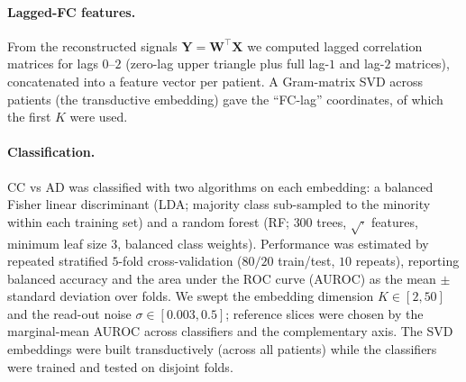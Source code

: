 \documentclass[11pt]{article}
\begin{document}
\paragraph{Lagged-FC features.}
From the reconstructed signals $\mathbf{Y}=\mathbf{W}^{\!\top}\mathbf{X}$ we
computed lagged correlation matrices for lags $0$--$2$ (zero-lag upper triangle
plus full lag-$1$ and lag-$2$ matrices), concatenated into a feature vector per
patient. A Gram-matrix SVD across patients (the transductive embedding) gave the
``FC-lag'' coordinates, of which the first $K$ were used.

\paragraph{Classification.}
CC vs AD was classified with two algorithms on each embedding: a balanced
Fisher linear discriminant (LDA; majority class sub-sampled to the minority
within each training set) and a random forest (RF; $300$ trees, $\sqrt{\cdot}$
features, minimum leaf size $3$, balanced class weights). Performance was
estimated by repeated stratified $5$-fold cross-validation ($80/20$ train/test,
$10$ repeats), reporting balanced accuracy and the area under the ROC curve
(AUROC) as the mean $\pm$ standard deviation over folds. We swept the embedding
dimension $K\in[2,50]$ and the read-out noise $\sigma\in[0.003,0.5]$; reference
slices were chosen by the marginal-mean AUROC across classifiers and the
complementary axis. The SVD embeddings were built transductively (across all
patients) while the classifiers were trained and tested on disjoint folds.
\end{document}

